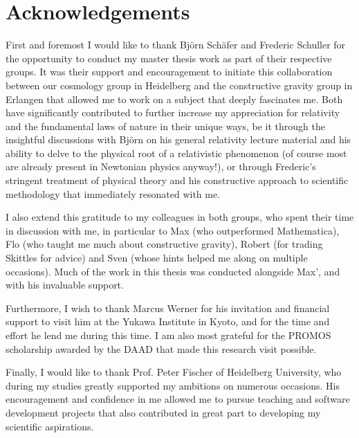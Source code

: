 \chapter{Acknowledgements}

First and foremost I would like to thank Björn Schäfer and Frederic Schuller for the opportunity to conduct my master thesis work as part of their respective groups. It was their support and encouragement to initiate this collaboration between our cosmology group in Heidelberg and the constructive gravity group in Erlangen that allowed me to work on a subject that deeply fascinates me. Both have significantly contributed to further increase my appreciation for relativity and the fundamental laws of nature in their unique ways, be it through the insightful discussions with Björn on his general relativity lecture material and his ability to delve to the physical root of a relativistic phenomenon (of course most are already present in Newtonian physics anyway!), or through Frederic's stringent treatment of physical theory and his constructive approach to scientific methodology that immediately resonated with me.

I also extend this gratitude to my colleagues in both groups, who spent their time in discussion with me, in particular to Max (who outperformed Mathematica), Flo (who taught me much about constructive gravity), Robert (for trading Skittles for advice) and Sven (whose hints helped me along on multiple occasions). Much of the work in this thesis was conducted alongside Max', and with his invaluable support.

Furthermore, I wish to thank Marcus Werner for his invitation and financial support to visit him at the Yukawa Institute in Kyoto, and for the time and effort he lend me during this time. I am also most grateful for the PROMOS scholarship awarded by the DAAD that made this research visit possible.

Finally, I would like to thank Prof. Peter Fischer of Heidelberg University, who during my studies greatly supported my ambitions on numerous occasions. His encouragement and confidence in me allowed me to pursue teaching and software development projects that also contributed in great part to developing my scientific aspirations.

